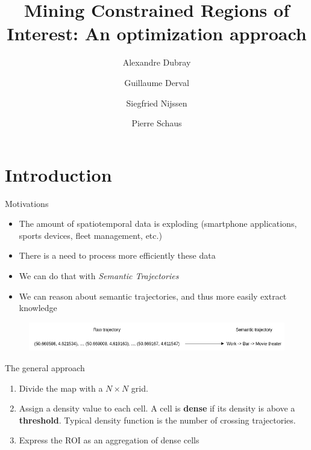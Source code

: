 \documentclass[10pt]{beamer}
\title{Mining Constrained Regions of Interest: An optimization approach}
\date{}
\author{Alexandre Dubray \and Guillaume Derval \and Siegfried Nijssen \and Pierre Schaus}
\institute{}
\begin{document}
\maketitle

\section{Introduction}

\begin{frame}{Motivations}
\begin{itemize}
    \item The amount of spatiotemporal data is exploding (smartphone applications, sports devices, fleet management, etc.)
    \item There is a need to process more efficiently these data
    \item We can do that with \emph{Semantic Trajectories}
    \item We can reason about semantic trajectories, and thus more easily extract knowledge
\end{itemize}

\begin{figure}
    \centering
    \includegraphics[scale=0.4]{figures/semantic_trajectory.png}
\end{figure}
\end{frame}

\begin{frame}{The general approach}
    \begin{enumerate}
        \item Divide the map with a $N \times N$ grid.
        \item Assign a density value to each cell. A cell is {\bf dense} if its density is above a {\bf threshold}.
            Typical density function is the number of crossing trajectories.
        \item Express the ROI as an aggregation of dense cells
    \end{enumerate}
\end{frame}
\end{document}
